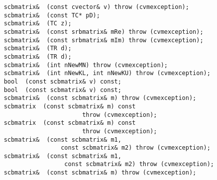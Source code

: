 \verb"    scbmatrix& "\verb" (const cvector& v) throw (cvmexception);"\\
\verb"    scbmatrix& "\verb" (const TC* pD);"\\
\verb"    scbmatrix& "\verb" (TC z);"\\
\verb"    scbmatrix& "\verb" (const srbmatrix& mRe) throw (cvmexception);"\\
\verb"    scbmatrix& "\verb" (const srbmatrix& mIm) throw (cvmexception);"\\
\verb"    scbmatrix& "\verb" (TR d);"\\
\verb"    scbmatrix& "\verb" (TR d);"\\
\verb"    scbmatrix& "\verb" (int nNewMN) throw (cvmexception);"\\
\verb"    scbmatrix& "\verb" (int nNewKL, int nNewKU) throw (cvmexception);"\\
\verb"    bool "\verb" (const scbmatrix& v) const;"\\
\verb"    bool "\verb" (const scbmatrix& v) const;"\\
\verb"    scbmatrix& "\verb" (const scbmatrix& m) throw (cvmexception);"\\
\verb"    scbmatrix "\verb" (const scbmatrix& m) const"\\
\verb"                          throw (cvmexception);"\\
\verb"    scbmatrix "\verb" (const scbmatrix& m) const"\\
\verb"                          throw (cvmexception);"\\
\verb"    scbmatrix& "\verb" (const scbmatrix& m1,"\\
\verb"                    const scbmatrix& m2) throw (cvmexception);"\\
\verb"    scbmatrix& "\verb" (const scbmatrix& m1,"\\
\verb"                     const scbmatrix& m2) throw (cvmexception);"\\
\verb"    scbmatrix& "\verb" (const scbmatrix& m) throw (cvmexception);"\\
